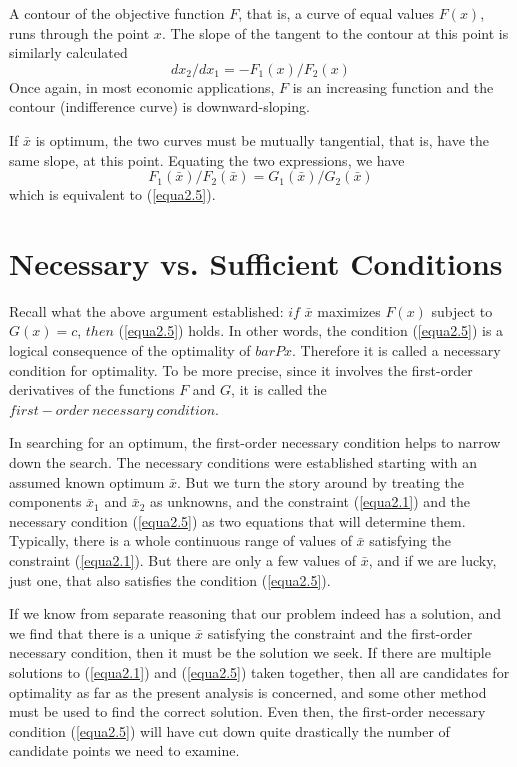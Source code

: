 A contour of the objective function $F$, that is, a curve of equal values $F(x)$, runs through the point $x$. The slope of the tangent to the contour at this point is similarly calculated
\begin{equation}\label{equa2.8}
dx_2 / dx_1 = - F_1(x) / F_2(x)
\end{equation}
Once again, in most economic applications, $F$ is an increasing function and the contour (indifference curve) is downward-sloping.

If $\bar{x}$ is optimum, the two curves must be mutually tangential, that is, have the same slope, at this point. Equating the two expressions, we have
\begin{equation}\label{equa2.9}
F_1(\bar{x}) / F_2(\bar{x}) = G_1(\bar{x}) / G_2(\bar{x})
\end{equation}
which is equivalent to (\ref{equa2.5}).

\section*{Necessary vs. Sufficient Conditions}

Recall what the above argument established: $if$ $\bar{x}$ maximizes $F(x)$ subject to $G(x)=c$, $then$ (\ref{equa2.5}) holds. In other words, the condition (\ref{equa2.5}) is a logical consequence of the optimality of $barP{x}$. Therefore it is called a necessary condition for optimality. To be more precise, since it involves the first-order derivatives of the functions $F$ and $G$, it is called the $first-order \ necessary \ condition$.

In searching for an optimum, the first-order necessary condition helps to narrow down the search. The necessary conditions were established starting with an assumed known optimum $\bar{x}$. But we turn the story around by treating the components $\bar{x}_1$ and $\bar{x}_2$ as unknowns, and the constraint (\ref{equa2.1}) and the necessary condition (\ref{equa2.5}) as two equations that will determine them. Typically, there is a whole continuous range of values of $\bar{x}$ satisfying the constraint (\ref{equa2.1}). But there are only a few values of $\bar{x}$, and if we are lucky, just one, that also satisfies the condition (\ref{equa2.5}).

If we know from separate reasoning that our problem indeed has a solution, and we find that there is a unique $\bar{x}$ satisfying the constraint and the first-order necessary condition, then it must be the solution we seek. If there are multiple solutions to (\ref{equa2.1}) and (\ref{equa2.5}) taken together, then all are candidates for optimality as far as the present analysis is concerned, and some other method must be used to find the correct solution. Even then, the first-order necessary condition (\ref{equa2.5}) will have cut down quite drastically the number of candidate points we need to examine.

